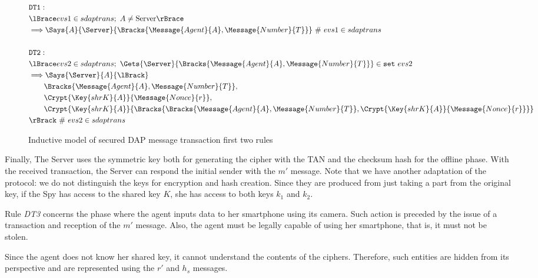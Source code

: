 \begin{figure}[h!]
  \begin{align*}
    & \texttt{DT1}: \newline \\
    & \lBrace evs1 \in sdaptrans;\ A \neq \text{Server} \rBrace \\
    & \Longrightarrow \Says{A}{\Server}{\Bracks{\Message{Agent}{A}, \Message{Number}{T}}} \ \# \ evs1 \in sdaptrans \\
    & \\
    & \texttt{DT2}: \newline \\
    & \lBrace evs2 \in sdaptrans;\ \Gets{\Server}{\Bracks{\Message{Agent}{A}, \Message{Number}{T}}} \in \texttt{set} \ evs2 \\
    & \Longrightarrow \Says{\Server}{A}{\lBrack} \\
    & \qquad \Bracks{\Message{Agent}{A}, \Message{Number}{T}}, \\
    & \qquad \Crypt{\Key{shrK}{A}}{\Message{Nonce}{r}}, \\
    & \qquad \Crypt{\Key{shrK}{A}}{\Bracks{\Bracks{\Message{Agent}{A}, \Message{Number}{T}}, \Crypt{\Key{shrK}{A}}{\Message{Nonce}{r}}}} \\
    & \rBrack \ \# \ evs2 \in sdaptrans
  \end{align*}
  \caption{Inductive model of secured DAP message transaction first two rules}
  \label{fig:dap-model-1}
\end{figure}

Finally, The Server uses the symmetric key both for generating the cipher with the TAN and the checksum hash for the offline phase. With the received transaction, the Server can respond the initial sender with the \(m'\) message. Note that we have another adaptation of the protocol: we do not distinguish the keys for encryption and hash creation. Since they are produced from just taking a part from the original key, if the Spy has access to the shared key \(K\), she has access to both keys \(k_1\) and \(k_2\).

Rule \textit{DT3} concerns the phase where the agent inputs data to her smartphone using its camera. Such action is preceded by the issue of a transaction and reception of the \(m'\) message. Also, the agent must be legally capable of using her smartphone, that is, it must not be stolen.

Since the agent does not know her shared key, it cannot understand the contents of the ciphers. Therefore, such entities are hidden from its perspective and are represented using the \(r'\) and \(h_s\) messages.

